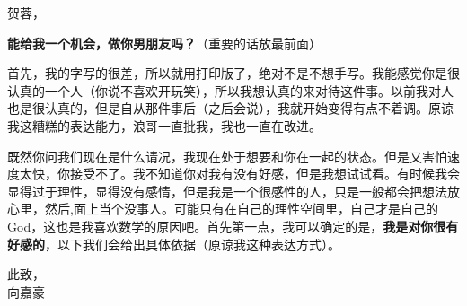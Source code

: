 \documentclass[a4paper,12pt]{letter}
\begin{document}
\begin{letter}{}

\opening{贺蓉，}

\textbf{能给我一个机会，做你男朋友吗？}（重要的话放最前面）

首先，我的字写的很差，所以就用打印版了，绝对不是不想手写。我能感觉你是很认真的一个人（你说不喜欢开玩笑），所以我想认真的来对待这件事。以前我对人也是很认真的，但是自从那件事后（之后会说），我就开始变得有点不着调。原谅我这糟糕的表达能力，浪哥一直批我，我也一直在改进。

既然你问我们现在是什么请况，我现在处于想要和你在一起的状态。但是又害怕速度太快，你接受不了。我不知道你对我有没有好感，但是我想试试看。有时候我会显得过于理性，显得没有感情，但是我是一个很感性的人，只是一般都会把想法放心里，然后,面上当个没事人。可能只有在自己的理性空间里，自己才是自己的God，这也是我喜欢数学的原因吧。首先第一点，我可以确定的是，\textbf{我是对你很有好感的}，以下我们会给出具体依据（原谅我这种表达方式）。

\closing{此致，\\ 向嘉豪}

\end{letter}
\end{document}
